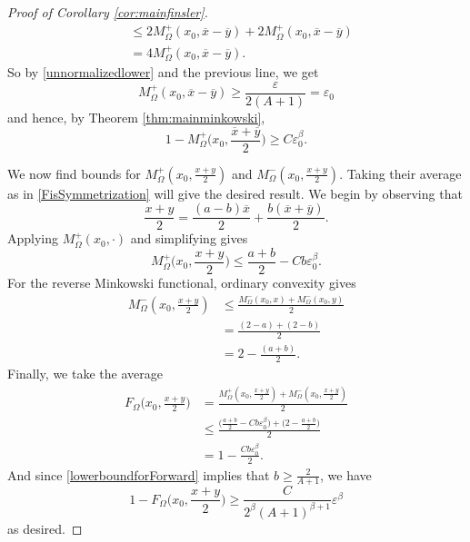 \documentclass[letterpaper, 11pt, reqno]{amsart}
\theoremstyle{definition}
\begin{document}
\begin{proof}[Proof of Corollary \ref{cor:mainfinsler}]
\begin{align}
 & \leq 2M^+_\Omega(x_0,\overline{x}-\overline{y}) + 2M^+_\Omega(x_0,\overline{x}-\overline{y})\\
 & = 4M^+_\Omega(x_0,\overline{x}-\overline{y}).
 \end{align}
So by \ref{unnormalizedlower} and the previous line, we get
\begin{equation}
    M^+_\Omega(x_0,\overline{x}-\overline{y}) \geq \frac{\varepsilon}{2(A+1)}=\varepsilon_0
\end{equation}
and hence, by Theorem \ref{thm:mainminkowski},
\begin{equation}
    1-M^+_\Omega\bigg(x_0,\frac{\overline{x}+\overline{y}}{2}\bigg) \geq C\varepsilon_0^\beta.
\end{equation}

We now find bounds for $M^+_\Omega(x_0,\frac{x+y}{2})$ and $M^-_\Omega(x_0,\frac{x+y}{2})$. Taking their average as in \ref{FisSymmetrization} will give the desired result. We begin by observing that
\begin{equation}
    \frac{x+y}{2}=\frac{(a-b)\overline{x}}{2} + \frac{b(\overline{x}+\overline{y})}{2}.
\end{equation}
Applying $M_\Omega^+(x_0,\cdot)$ and simplifying gives
\begin{equation}
 M^+_\Omega\bigg(x_0,\frac{x+y}{2}\bigg)  \leq \frac{a+b}{2} - Cb\varepsilon_0^\beta .
\end{equation}
For the reverse Minkowski functional, ordinary convexity gives
\begin{align}
    M^-_\Omega(x_0,\frac{x+y}{2}) &\leq \frac{M_\Omega^-(x_0,x) + M_\Omega^-(x_0,y)}{2}\\
    & = \frac{(2-a) + (2-b)}{2}\\
    & = 2 - \frac{(a+b)}{2}.
\end{align}
Finally, we take the average
\begin{align}
 F_\Omega\bigg(x_0,\frac{x+y}{2}\bigg) & = \frac{M^+_\Omega(x_0,\frac{x+y}{2}) + M^-_\Omega(x_0,\frac{x+y}{2})}{2} \\
 & \leq \frac{\big(\frac{a+b}{2} - Cb\varepsilon_0^\beta\big) + \big(2 - \frac{a+b}{2}\big)}{2} \\
 & = 1-\frac{Cb\varepsilon_0^\beta}{2}.
\end{align}
And since \ref{lowerboundforForward} implies that $b \geq \frac{2}{A+1}$, we have
\begin{equation}
    1-F_\Omega\bigg(x_0,\frac{x+y}{2}\bigg) \geq \frac{C}{2^\beta(A+1)^{\beta+1}}\varepsilon^\beta
\end{equation}
as desired.


\end{proof}
\end{document}
